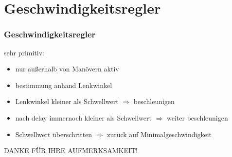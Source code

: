 \documentclass{beamer}
\begin{document}
	\section{Geschwindigkeitsregler}
	
	\begin{frame}
	\frametitle{Geschwindigkeitsregler}
	sehr primitiv:
		\begin{itemize}
			\item nur außerhalb von Manövern aktiv
			\item bestimmung anhand Lenkwinkel
			\item Lenkwinkel kleiner als Schwellwert $\Rightarrow$ beschleunigen
			\item nach delay immernoch kleiner als Schwellwert $\Rightarrow$ weiter beschleunigen
			\item Schwellwert überschritten $\Rightarrow$ zurück auf Minimalgeschwindigkeit
		\end{itemize}
	\end{frame}
	
	\begin{frame}
		\center
		DANKE FÜR IHRE AUFMERKSAMKEIT!
	\end{frame}
\end{document}
